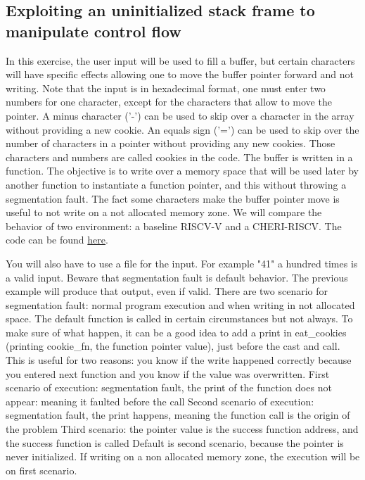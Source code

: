 \documentclass[a4paper, 11pt]{article}
\begin{document}
	\subsection{Exploiting an uninitialized stack frame to manipulate control flow}
		In this exercise, the user input will be used to fill a buffer, but certain characters will have specific effects allowing one to move the buffer pointer forward and not writing. Note that the input is in hexadecimal format, one must enter two numbers for one character, except for the characters that allow to move the pointer.
		A minus character ('-') can be used to skip over a character in the array without providing a new cookie. An equals sign ('=') can be used to skip over the number of characters in a pointer without providing any new cookies. 
		Those characters and numbers are called cookies in the code.
		The buffer is written in a function. The objective is to write over a memory space that will be used later by another function to instantiate a function pointer, and this without throwing a segmentation fault.
		The fact some characters make the buffer pointer move is useful to not write on a not allocated memory zone.
		We will compare the behavior of two environment: a baseline RISCV-V and a CHERI-RISCV.
		The code can be found \href{https://ctsrd-cheri.github.io/cheri-exercises/missions/uninitialized-stack-frame-control-flow/index.html}{here}.
		
		You will also have to use a file for the input. For example "41" a hundred times is a valid input.
		Beware that segmentation fault is default behavior. The previous example will produce that output, even if valid. There are two scenario for segmentation fault: normal program execution and when writing in not allocated space.
		The default function is called in certain circumstances but not always.
		To make sure of what happen, it can be a good idea to add a print in eat\_cookies (printing cookie\_fn, the function pointer value), just before the cast and call. This is useful for two reasons: you know if the write happened correctly because you entered next function and you know if the value was overwritten. 
		First scenario of execution: segmentation fault, the print of the function does not appear: meaning it faulted before the call
		Second scenario of execution: segmentation fault, the print happens, meaning the function call is the origin of the problem
		Third scenario: the pointer value is the success function address, and the success function is called
		Default is second scenario, because the pointer is never initialized. If writing on a non allocated memory zone, the execution will be on first scenario.
\end{document}
